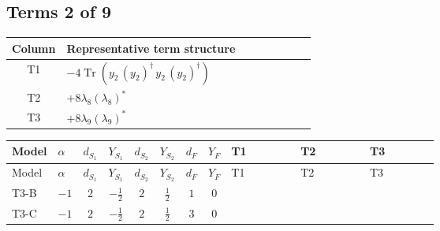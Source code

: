 \documentclass[8pt]{article}
\begin{document}
\begin{landscape}
\subsection*{Terms 2 of 9}
\begin{center}
\begin{tabular}{@{}c >{\raggedright\arraybackslash}p{0.82\linewidth}@{}}
\toprule
Column & Representative term structure \\
\midrule
T1 & \(\displaystyle -4 \operatorname{Tr}\!\left({y_2}\,\left({y_2}\right)^{\dagger}\,{y_2}\,\left({y_2}\right)^{\dagger}\right)\) \\
\midrule
T2 & \(\displaystyle +8 {\lambda_{8}} \left({\lambda_{8}}\right)^{*}\) \\
\midrule
T3 & \(\displaystyle +8 {\lambda_{9}} \left({\lambda_{9}}\right)^{*}\) \\
\midrule
\bottomrule
\end{tabular}
\end{center}
\smallskip
\tiny
\begin{longtable}{@{}llcccccc >{\raggedright\arraybackslash}p{0.21\linewidth} >{\raggedright\arraybackslash}p{0.21\linewidth} >{\raggedright\arraybackslash}p{0.21\linewidth}@{}}
\toprule
Model & $\alpha$ & $d_{S_1}$ & $Y_{S_1}$ & $d_{S_2}$ & $Y_{S_2}$ & $d_F$ & $Y_F$ & T1 & T2 & T3 \\
\midrule
\endfirsthead
\toprule
Model & $\alpha$ & $d_{S_1}$ & $Y_{S_1}$ & $d_{S_2}$ & $Y_{S_2}$ & $d_F$ & $Y_F$ & T1 & T2 & T3 \\
\midrule
\endhead
T3-B & $-1$ & $2$ & $-\frac{1}{2}$ & $2$ & $\frac{1}{2}$ & $1$ & $0$ & \scriptsize\adjustbox{max width=\linewidth}{$\begin{gathered} -4 \operatorname{Tr}\!\left({y_2}\,\left({y_2}\right)^{\dagger}\,{y_2}\,\left({y_2}\right)^{\dagger}\right)\end{gathered}$} & \scriptsize\adjustbox{max width=\linewidth}{$\begin{gathered} +8 {\lambda_{8}} \left({\lambda_{8}}\right)^{*}\end{gathered}$} & \scriptsize\adjustbox{max width=\linewidth}{$\begin{gathered} +8 {\lambda_{9}} \left({\lambda_{9}}\right)^{*}\end{gathered}$} \\
\midrule
T3-C & $-1$ & $2$ & $-\frac{1}{2}$ & $2$ & $\frac{1}{2}$ & $3$ & $0$ & \scriptsize\adjustbox{max width=\linewidth}{$\begin{gathered} -5 \operatorname{Tr}\!\left({y_2}\,\left({y_2}\right)^{\dagger}\,{y_2}\,\left({y_2}\right)^{\dagger}\right)\end{gathered}$} & \scriptsize\adjustbox{max width=\linewidth}{$\begin{gathered} +8 {\lambda_{8}} \left({\lambda_{8}}\right)^{*}\end{gathered}$} & \scriptsize\adjustbox{max width=\linewidth}{$\begin{gathered} +8 {\lambda_{9}} \left({\lambda_{9}}\right)^{*}\end{gathered}$} \\

\end{longtable}
\end{landscape}
\end{document}
